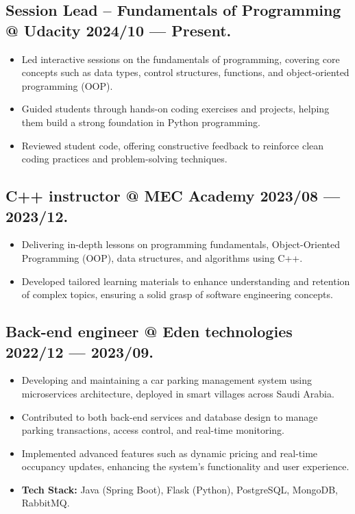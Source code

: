 \documentclass[a4,10pt]{article}
\newenvironment{zitemize}{
\begin{itemize}\itemsep0pt \parskip0pt \parsep1pt}
{\end{itemize}\vspace{-0.5cm}}
\begin{document}
\subsection*{Session Lead – Fundamentals of Programming @ Udacity \hfill 2024/10 --- Present.} 
    \begin{zitemize}
        \item Led interactive sessions on the fundamentals of programming, covering core concepts such as data types, control structures, functions, and object-oriented programming (OOP).
        \item Guided students through hands-on coding exercises and projects, helping them build a strong foundation in Python programming.
        \item Reviewed student code, offering constructive feedback to reinforce clean coding practices and problem-solving techniques.
    \end{zitemize}

\subsection*{C++ instructor @ MEC Academy \hfill 2023/08 --- 2023/12.} 
    \begin{zitemize}
        \item Delivering in-depth lessons on programming fundamentals, Object-Oriented Programming (OOP), 
        data structures, and algorithms using C++.
        \item Developed tailored learning materials to enhance understanding and retention of complex topics, ensuring a solid grasp of software 
        engineering concepts.

    \end{zitemize}

\subsection*{Back-end engineer @ Eden technologies \hfill 2022/12 --- 2023/09.} 
    \begin{zitemize}
        \item Developing and maintaining a car parking management system using microservices architecture, deployed in smart villages across Saudi Arabia.
        \item Contributed to both back-end services and database design to manage parking transactions, access control, and real-time monitoring.
        \item Implemented advanced features such as dynamic pricing and real-time occupancy updates, enhancing the system’s functionality and user experience.
        \item \textbf{Tech Stack:} Java (Spring Boot), Flask (Python), PostgreSQL, MongoDB, RabbitMQ.
    \end{zitemize}
\end{document}
